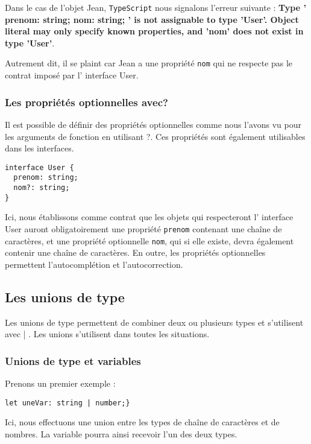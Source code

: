 Dans le cas de l'objet {\color{blue} Jean}, {\tt TypeScript} nous signalons l'erreur suivante : {\bf Type '{ prenom: string; nom: string; }' is not assignable to type 'User'. Object literal may only specify known properties, and 'nom' does not exist in type 'User'}.

Autrement dit, il se plaint car {\color{blue} Jean} a une propriété {\tt nom} qui ne respecte pas le contrat imposé par l' interface {\color{monOrange} User}.

\subsubsection{Les propriétés optionnelles avec?}
Il est possible de définir des propriétés optionnelles comme nous l'avons vu pour les arguments de fonction en utilisant {\color{monOrange} ?}. Ces propriétés sont également utilisables dans les interfaces.
\begin{verbatim}
interface User {
  prenom: string;
  nom?: string;
}
\end{verbatim}

Ici, nous établissons comme contrat que les objets qui respecteront l' {\color{monOrange}interface User} auront obligatoirement une propriété {\tt prenom} contenant une chaîne de caractères, et une propriété optionnelle {\tt nom}, qui si elle existe, devra également contenir une chaîne de caractères. En outre, les propriétés optionnelles permettent l'autocomplétion et l'autocorrection.

\subsection{Les unions de type}
Les unions de type permettent de combiner deux ou plusieurs types et s'utilisent avec {\color{monOrange}|} . Les unions s'utilisent dans toutes les situations.

\subsubsection{Unions de type et variables}
Prenons un premier exemple :
\begin{verbatim}
let uneVar: string | number;}
\end{verbatim}

Ici, nous effectuons une union entre les types de chaîne de caractères et de nombres. La variable pourra ainsi recevoir l'un des deux types.

